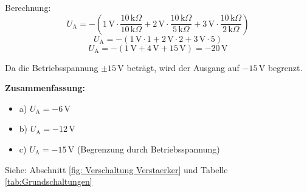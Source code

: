 {    Berechnung:
    \[
        U_\mathrm{A} = -\left( 1\,\mathrm{V} \cdot \frac{10\,\mathrm{k}\Omega}{10\,\mathrm{k}\Omega} + 2\,\mathrm{V} \cdot \frac{10\,\mathrm{k}\Omega}{5\,\mathrm{k}\Omega} + 3\,\mathrm{V} \cdot \frac{10\,\mathrm{k}\Omega}{2\,\mathrm{k}\Omega} \right)
    \]
    \[
        U_\mathrm{A} = -\left( 1\,\mathrm{V} \cdot 1 + 2\,\mathrm{V} \cdot 2 + 3\,\mathrm{V} \cdot 5 \right)
    \]
    \[
        U_\mathrm{A} = -(1\,\mathrm{V} + 4\,\mathrm{V} + 15\,\mathrm{V}) = -20\,\mathrm{V}
    \]

    Da die Betriebsspannung $\pm 15\,\mathrm{V}$ beträgt, wird der Ausgang auf $-15\,\mathrm{V}$ begrenzt.


    \textbf{Zusammenfassung:}
    \begin{itemize}
        \item a) $U_\mathrm{A} = -6\,\mathrm{V}$
        \item b) $U_\mathrm{A} = -12\,\mathrm{V}$
        \item c) $U_\mathrm{A} = -15\,\mathrm{V}$ (Begrenzung durch Betriebsspannung)
    \end{itemize}

    Siehe: Abschnitt \ref{fig: Verschaltung Verstaerker} und Tabelle \ref{tab:Grundschaltungen}
}
